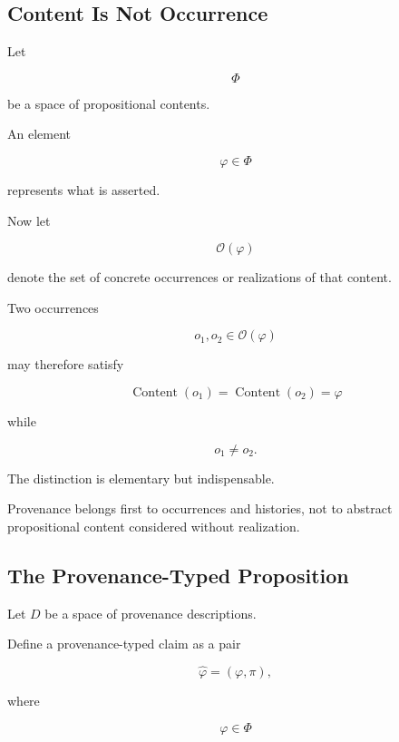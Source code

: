 \documentclass[
  11pt,
  a4paper,
  DIV=12,
  BCOR=0mm,
  parskip=half-
]{scrartcl}
\newcommand{\Content}{\operatorname{Content}}
\theoremstyle{definition}
\theoremstyle{plain}
\theoremstyle{remark}
\begin{document}

\subsection{Content Is Not Occurrence}
\label{app:content-occurrence}

Let

\[
  \Phi
\]

be a space of propositional contents.

An element

\[
  \varphi\in\Phi
\]

represents what is asserted.

Now let

\[
  \mathcal O(\varphi)
\]

denote the set of concrete occurrences or realizations of that content.

Two occurrences

\[
  o_1,o_2\in\mathcal O(\varphi)
\]

may therefore satisfy

\[
  \Content(o_1)
  =
  \Content(o_2)
  =
  \varphi
\]

while

\[
  o_1\neq o_2.
\]

The distinction is elementary but indispensable.

Provenance belongs first to occurrences and histories, not to abstract
propositional content considered without realization.


\subsection{The Provenance-Typed Proposition}
\label{app:typed-proposition}

Let \(D\) be a space of provenance descriptions.

Define a provenance-typed claim as a pair

\[
  \widehat{\varphi}
  =
  (\varphi,\pi),
\]

where

\[
  \varphi\in\Phi
\]
\end{document}
